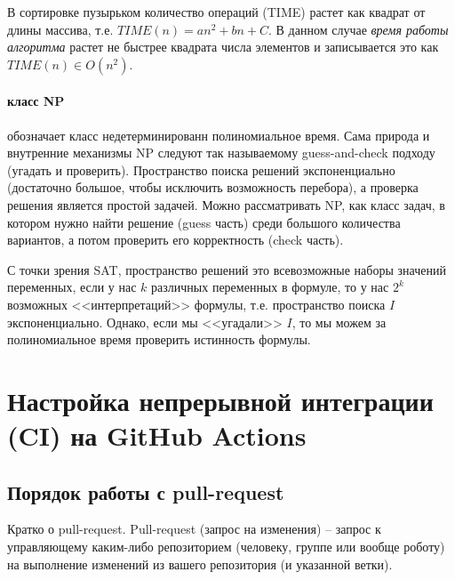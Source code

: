 \documentclass[%
	11pt,
	a4paper,
	utf8,
		]{article}
\begin{document}
В сортировке пузырьком количество операций (TIME) растет как квадрат от длины массива, т.е. $ TIME(n) = a n^2 + b n + C $. В данном случае \emph{время работы алгоритма} растет не быстрее квадрата числа элементов и записывается это как $ TIME(n) \in O(n^2) $.

\paragraph{класс NP} обозначает класс недетерминированн полиномиальное время. Сама природа и внутренние механизмы NP следуют так называемому guess-and-check подходу (угадать и проверить). Пространство поиска решений экспоненциально (достаточно большое, чтобы исключить возможность перебора), а проверка решения является простой задачей. Можно рассматривать NP, как класс задач, в котором нужно найти решение (guess часть) среди большого количества вариантов, а потом проверить его корректность (check часть).

 С точки зрения SAT, пространство решений это всевозможные наборы значений переменных, если у нас $ k $ различных переменных в формуле, то у нас $ 2^k $ возможных <<интерпретаций>> формулы, т.е. пространство поиска $ I $ экспоненциально. Однако, если мы <<угадали>> $ I $, то мы можем за полиномиальное время проверить истинность формулы.



\section{Настройка непрерывной интеграции (CI) на GitHub Actions}

\subsection{Порядок работы с pull-request}

Кратко о pull-request. Pull-request (запрос на изменения) -- запрос к управляющему каким-либо репозиторием (человеку, группе или вообще роботу) на выполнение изменений из вашего репозитория (и указанной ветки).
\end{document}
